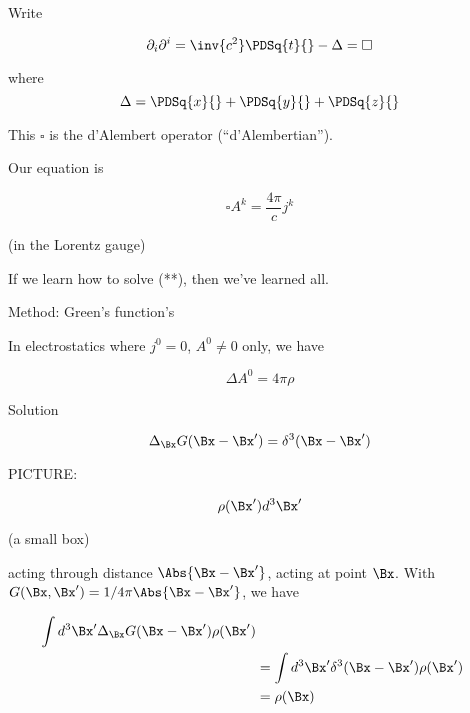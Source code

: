 Write

\begin{equation}\label{eqn:relativisticElectrodynamicsL17:290}
\partial_i \partial^i = \inv{c^2} \PDSq{t}{} - \Delta = \square
\end{equation}

where
\begin{equation}\label{eqn:relativisticElectrodynamicsL17:291}
\Delta = \PDSq{x}{} + \PDSq{y}{} + \PDSq{z}{}
\end{equation}

This $\square$ is the d'Alembert operator (``d'Alembertian'').

Our equation is 

\begin{equation}\label{eqn:relativisticElectrodynamicsL17:310}
\square A^k = \frac{4 \pi}{c} j^k
\end{equation}

(in the Lorentz gauge)

If we learn how to solve (**), then we've learned all.

Method: Green's function's

In electrostatics where $j^0 = 0$, $A^0 \ne 0$ only, we have

\begin{equation}\label{eqn:relativisticElectrodynamicsL17:330}
\Delta A^0 = 4 \pi \rho
\end{equation}

Solution 

\begin{equation}\label{eqn:relativisticElectrodynamicsL17:350}
\Delta_{\Bx} G(\Bx - \Bx') = \delta^3( \Bx - \Bx')
\end{equation}

PICTURE: 

\begin{equation}\label{eqn:relativisticElectrodynamicsL17:370}
\rho(\Bx') d^3 \Bx'
\end{equation}

(a small box)

acting through distance $\Abs{\Bx - \Bx'}$, acting at point $\Bx$.  With $G(\Bx, \Bx') = 1/4 \pi\Abs{\Bx - \Bx'}$, we have

\begin{align*}
\int d^3 \Bx' \Delta_{\Bx} G(\Bx - \Bx') \rho(\Bx') \\
&= \int d^3 \Bx' \delta^3( \Bx - \Bx') \rho(\Bx') \\
&= \rho(\Bx)
\end{align*}


